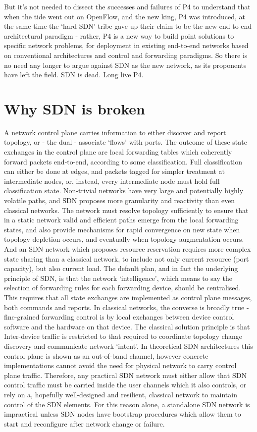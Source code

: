 But it’s not needed to dissect the successes and failures of P4 to understand that when the tide went out on OpenFlow, and the new king, P4 was introduced, at the same time the ‘hard SDN’ tribe gave up their claim to be the new end-to-end architectural paradigm - rather, P4 is a new way to build point solutions to specific network problems, for deployment in existing end-to-end networks based on conventional architectures and control and forwarding paradigms.
So there is no need any longer to argue against SDN as the new network, as its proponents have left the field.
SDN is dead.
Long live P4.

\section{Why SDN is broken}

A network control plane carries information to either discover and report topology, or - the dual - associate ‘flows’ with ports.
The outcome of these state exchanges in the control plane are local forwarding tables which coherently forward packets end-to-end, according to some classification.
Full classification can either be done at edges, and packets tagged for simpler treatment at intermediate nodes, or, instead, every intermediate node must hold full classification state.
Non-trivial networks have very large and potentially highly volatile paths, and SDN proposes more granularity and reactivity than even classical networks.
The network must resolve topology sufficiently to ensure that in a static network valid and efficient paths emerge from the local forwarding states, and also provide mechanisms for rapid convergence on new state when topology depletion occurs, and eventually when topology augmentation occurs.
And an SDN network which proposes resource reservation requires more complex state sharing than a classical network, to include not only current resource (port capacity), but also current load.
The default plan, and in fact the underlying principle of SDN, is that the network ‘intelligence’, which means to say the selection of forwarding rules for each forwarding device, should be centralised.
This requires that all state exchanges are implemented as control plane messages, both commands and reports.
In classical networks, the converse is broadly true - fine-grained forwarding control is by local exchanges between device control software and the hardware on that device.
The classical solution principle is that Inter-device traffic is restricted to that required to coordinate topology change discovery and communicate network ‘intent’.
In theoretical SDN architectures this control plane is shown as an out-of-band channel, however concrete implementations cannot avoid the need for physical network to carry control plane traffic.
Therefore, any practical SDN network must either allow that SDN control traffic must be carried inside the user channels which it also controls, or rely on a, hopefully well-designed and resilient, classical network to maintain control of the SDN elements.
For this reason alone, a standalone SDN network is impractical unless SDN nodes have bootstrap procedures which allow them to start and reconfigure after network change or failure.

